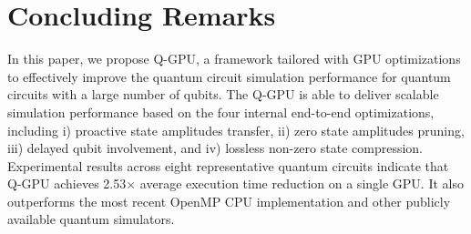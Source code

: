 \section{Concluding Remarks}
In this paper, we propose Q-GPU, a framework tailored with GPU optimizations to effectively improve the quantum circuit simulation performance for quantum circuits with a large number of qubits. The Q-GPU is able to deliver scalable simulation performance based on the four internal end-to-end optimizations, including i) proactive state amplitudes transfer, ii) zero state amplitudes pruning, iii) delayed qubit involvement, and iv) lossless non-zero state compression. Experimental results across eight representative quantum circuits indicate that Q-GPU achieves 2.53$\times$ average execution time reduction on a single GPU. It also outperforms the most recent OpenMP CPU implementation and other publicly available quantum simulators. 
